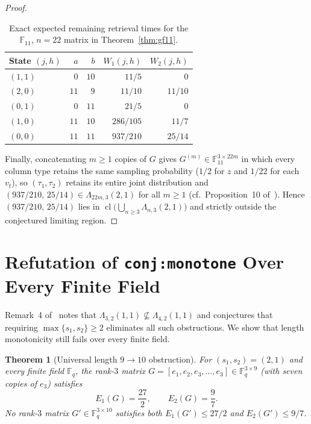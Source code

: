 \documentclass[11pt]{article}
\theoremstyle{plain}
\newtheorem{theorem}{Theorem}
\theoremstyle{definition}
\theoremstyle{remark}
\DeclareMathOperator{\cl}{cl}
\begin{document}
\begin{proof}
\begin{table}[htbp]
\centering
\begin{tabular}{@{}lrrrr@{}}
\toprule
State $(j, h)$ & $a$ & $b$ & $W_1(j, h)$ & $W_2(j, h)$ \\
\midrule
$(1, 1)$ & $0$  & $10$ & $11/5$    & $0$ \\
$(2, 0)$ & $11$ & $9$  & $11/10$   & $11/10$ \\
$(0, 1)$ & $0$  & $11$ & $21/5$    & $0$ \\
$(1, 0)$ & $11$ & $10$ & $286/105$ & $11/7$ \\
$(0, 0)$ & $11$ & $11$ & $937/210$ & $25/14$ \\
\bottomrule
\end{tabular}
\caption{Exact expected remaining retrieval times for the $\mathbb{F}_{11}$, $n = 22$ matrix in Theorem~\ref{thm:gf11}.}\label{tab:gf11}
\end{table}

Finally, concatenating $m \ge 1$ copies of $G$ gives $G^{(m)} \in \mathbb{F}_{11}^{3 \times 22m}$ in which every column type retains the same sampling probability ($1/2$ for $z$ and $1/22$ for each $v_t$), so $(\tau_1, \tau_2)$ retains its entire joint distribution and $(937/210,\, 25/14) \in \Lambda_{22m, 3}(2, 1)$ for all $m \ge 1$ (cf.\ Proposition~10 of~\cite{BarLev2026}).
Hence $(937/210,\, 25/14)$ lies in $\cl\!\bigl(\bigcup_{n \ge 3}\Lambda_{n,3}(2,1)\bigr)$ and strictly outside the conjectured limiting region.
\end{proof}

\section{Refutation of \texttt{conj:monotone} Over Every Finite Field}

Remark~4 of~\cite{BarLev2026} notes that $\Lambda_{3,2}(1,1) \not\subseteq \Lambda_{4,2}(1,1)$ and conjectures that requiring $\max\{s_1, s_2\} \ge 2$ eliminates all such obstructions. We show that length monotonicity still fails over every finite field.

\begin{theorem}[Universal length $9 \to 10$ obstruction]\label{thm:monotone}
For $(s_1, s_2) = (2, 1)$ and every finite field $\mathbb{F}_q$, the rank-$3$ matrix $G = [e_1, e_2, e_3, \dots, e_3] \in \mathbb{F}_q^{3 \times 9}$ (with seven copies of $e_3$) satisfies
\[
E_1(G) = \frac{27}{2}, \qquad E_2(G) = \frac{9}{7}.
\]
No rank-$3$ matrix $G' \in \mathbb{F}_q^{3 \times 10}$ satisfies both $E_1(G') \le 27/2$ and $E_2(G') \le 9/7$.
\end{theorem}
\end{document}
